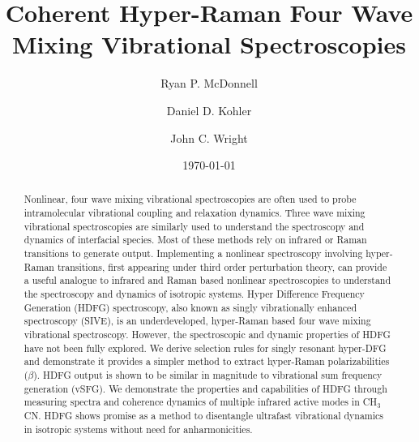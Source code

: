 \documentclass[aip, jcp, reprint, onecolumn]{revtex4-2}
\begin{document}
\title{Coherent Hyper-Raman Four Wave Mixing Vibrational Spectroscopies}


\author{Ryan P. McDonnell} 
\author{Daniel D. Kohler}
\author{John C. Wright} 


\date{\today}

\begin{abstract}
Nonlinear, four wave mixing vibrational spectroscopies are often used to probe intramolecular vibrational coupling and relaxation dynamics.
Three wave mixing vibrational spectroscopies are similarly used to understand the spectroscopy and dynamics of interfacial species.
Most of these methods rely on infrared or Raman transitions to generate output. 
Implementing a nonlinear spectroscopy involving hyper-Raman transitions, first appearing under third order perturbation theory, can provide a useful analogue to infrared and Raman based nonlinear spectroscopies to understand the spectroscopy and dynamics of isotropic systems.
Hyper Difference Frequency Generation (HDFG) spectroscopy, also known as singly vibrationally enhanced spectroscopy (SIVE), is an underdeveloped, hyper-Raman based four wave mixing vibrational spectroscopy. 
However, the spectroscopic and dynamic properties of HDFG have not been fully explored.
We derive selection rules for singly resonant hyper-DFG and demonstrate it provides a simpler method to extract hyper-Raman polarizabilities ($\beta$).
HDFG output is shown to be similar in magnitude to vibrational sum frequency generation (vSFG). 
We demonstrate the properties and capabilities of HDFG through measuring spectra and coherence dynamics of multiple infrared active modes in CH$_3$CN.
HDFG shows promise as a method to disentangle ultrafast vibrational dynamics in isotropic systems without need for anharmonicities.

\end{abstract}

\maketitle
\end{document}
